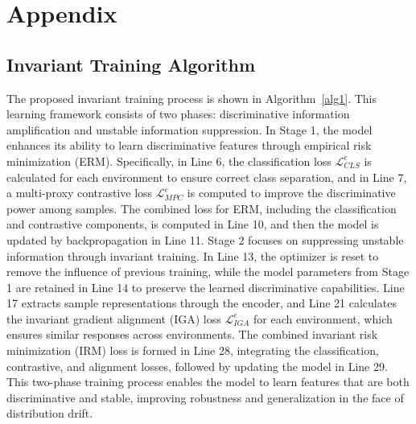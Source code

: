 \section{Appendix}



\subsection{Invariant Training Algorithm}


The proposed invariant training process is shown in Algorithm~\ref{alg1}. This learning framework consists of two phases: discriminative information amplification and unstable information suppression. In Stage 1, the model enhances its ability to learn discriminative features through empirical risk minimization (ERM). Specifically, in Line 6, the classification loss $\mathcal{L}^{e}_{CLS}$ is calculated for each environment to ensure correct class separation, and in Line 7, a multi-proxy contrastive loss $\mathcal{L}^{e}_{MPC}$ is computed to improve the discriminative power among samples. The combined loss for ERM, including the classification and contrastive components, is computed in Line 10, and then the model is updated by backpropagation in Line 11. Stage 2 focuses on suppressing unstable information through invariant training. In Line 13, the optimizer is reset to remove the influence of previous training, while the model parameters from Stage 1 are retained in Line 14 to preserve the learned discriminative capabilities. Line 17 extracts sample representations through the encoder, and Line 21 calculates the invariant gradient alignment (IGA) loss $\mathcal{L}^e_{IGA}$ for each environment, which ensures similar responses across environments. The combined invariant risk minimization (IRM) loss is formed in Line 28, integrating the classification, contrastive, and alignment losses, followed by updating the model in Line 29. This two-phase training process enables the model to learn features that are both discriminative and stable, improving robustness and generalization in the face of distribution drift.


